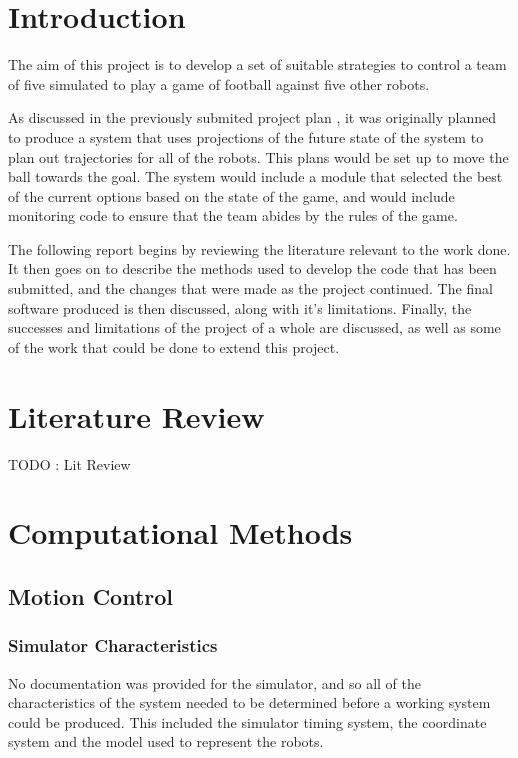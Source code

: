 \documentclass[10pt]{article}
\begin{document}


\section{Introduction}

The aim of this project is to develop a set of suitable strategies to control a
team of five simulated to play a game of football against five other robots.

As discussed in the previously submited project plan \cite{pplr}, it was
originally planned to produce a system that uses projections of the future state
of the system to plan out trajectories for all of the robots.  This plans would
be set up to move the ball towards the goal.  The system would include a module
that selected the best of the current options based on the state of the game,
and would include monitoring code to ensure that the team abides by the rules of
the game.

The following report begins by reviewing the literature relevant to the work
done.  It then goes on to describe the methods used to develop the code that has
been submitted, and the changes that were made as the project continued. The
final software produced is then discussed, along with it's limitations. Finally,
the successes and limitations of the project of a whole are discussed, as well
as some of the work that could be done to extend this project.

\section{Literature Review}

TODO : Lit Review

\section{Computational Methods}

\subsection{Motion Control\label{sub:motionControl}}

\subsubsection{Simulator Characteristics}

No documentation was provided for the simulator, and so all of the
characteristics of the system needed to be determined before a working system
could be produced.  This included the simulator timing system, the coordinate
system and the model used to represent the robots.
\end{document}
